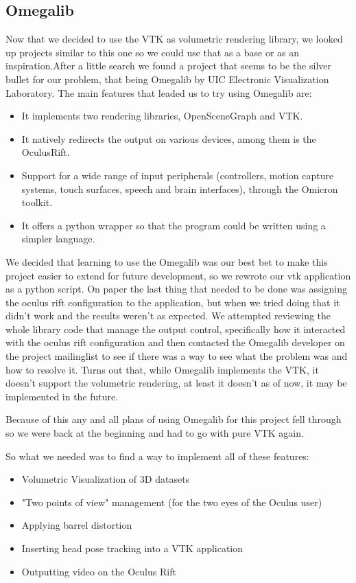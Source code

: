 \documentclass[11pt]{article} %
\begin{document}
\subsection{Omegalib}
Now that we decided to use the VTK as volumetric rendering library, we looked up projects similar to this one so we could use that as a base or as an inspiration.After a little search we found a project that seems to be the silver bullet for our problem, that being Omegalib by UIC Electronic Visualization Laboratory.
\newline
\newline
The main features that leaded us to try using Omegalib are:
\begin{itemize}
\item It implements two rendering libraries, OpenSceneGraph and VTK.
\item It natively redirects  the output on various devices, among them is the OculusRift.
\item Support for a wide range of input peripherals (controllers, motion  capture systems, touch surfaces, speech and brain interfaces), through  the  Omicron toolkit.
\item It offers a python wrapper so that the program could be written using a simpler language.
\end{itemize}

\noindent
We decided that learning to use the Omegalib was our best bet to make this project easier to extend for future development, so we rewrote our vtk application as a python script.
On paper the last thing that needed to be done was assigning the oculus rift configuration to the application, but when we tried doing that it didn't work and the results weren't as expected.
We attempted  reviewing the whole library code that manage the output control, specifically how it interacted with the oculus rift configuration and then contacted the Omegalib developer on the project mailinglist to see if there was a way to see what the problem was and how to resolve it.
Turns out that, while Omegalib implements the VTK, it doesn't support the volumetric rendering, at least it doesn't as of now, it may be implemented in the future.

Because of this any and all plans of using Omegalib for this project fell through so we were back at the beginning and had to go with pure VTK again.

So what we needed was to find a way to implement all of these features:
\begin{itemize}
\item Volumetric Visualization of 3D datasets
\item "Two points of view" management (for the two eyes of the Oculus user)
\item Applying barrel distortion
\item Inserting head pose tracking into a VTK application
\item Outputting video on the Oculus Rift
\end{itemize}
\end{document}
